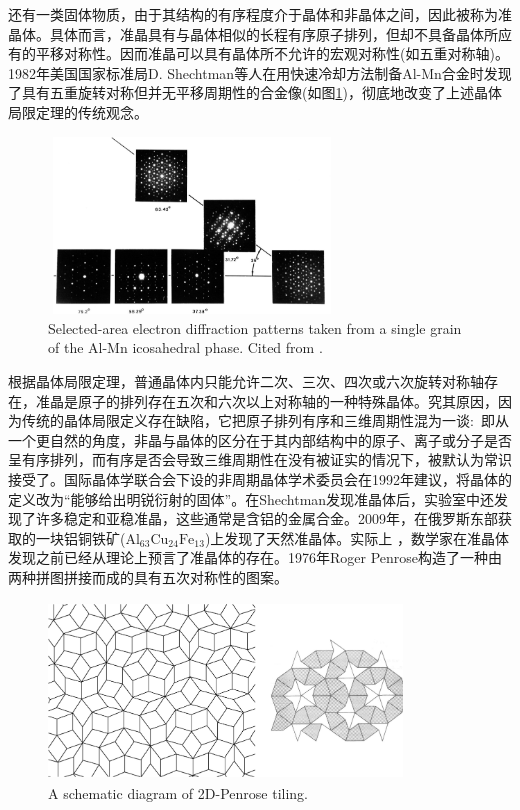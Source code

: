 还有一类固体物质，由于其结构的有序程度介于晶体和非晶体之间，因此被称为准晶体。具体而言，准晶具有与晶体相似的长程有序原子排列，但却不具备晶体所应有的平移对称性。因而准晶可以具有晶体所不允许的宏观对称性(如五重对称轴)。%
1982年美国国家标准局D. Shechtman等人在用快速冷却方法制备Al-Mn合金时发现了具有五重旋转对称但并无平移周期性的合金像(如图\ref{Fig:SSI-03})，彻底地改变了上述晶体局限定理的传统观念。
\begin{figure}[h!]
\centering
\vspace*{-0.1in}
\includegraphics[height=1.85in,width=3.0in,viewport=0 0 791 504,clip]{Figures/quasicrystal.png}
\caption{\small \textrm{Selected-area electron diffraction patterns taken from a single grain of the Al-Mn icosahedral phase. Cited from . }}%
\label{Fig:SSI-03}
\end{figure}
根据晶体局限定理，普通晶体内只能允许二次、三次、四次或六次旋转对称轴存在，准晶是原子的排列存在五次和六次以上对称轴的一种特殊晶体。究其原因，因为传统的晶体局限定义存在缺陷，它把原子排列有序和三维周期性混为一谈:~即从一个更自然的角度，非晶与晶体的区分在于其内部结构中的原子、离子或分子是否呈有序排列，而有序是否会导致三维周期性在没有被证实的情况下，被默认为常识接受了。国际晶体学联合会下设的非周期晶体学术委员会在1992年建议，将晶体的定义改为``能够给出明锐衍射的固体''。在Shechtman发现准晶体后，实验室中还发现了许多稳定和亚稳准晶，这些通常是含铝的金属合金。2009年，在俄罗斯东部获取的一块铝铜铁矿($\mathrm{Al}_{63}\mathrm{Cu}_{24}\mathrm{Fe}_{13}$)上发现了天然准晶体。实际上 ，数学家在准晶体发现之前已经从理论上预言了准晶体的存在。1976年Roger Penrose构造了一种由两种拼图拼接而成的具有五次对称性的图案。
\begin{figure}[h!]
\centering
\vspace*{-0.1in}
\includegraphics[height=1.85in,width=3.7in,viewport=0 0 1931 939,clip]{Figures/Penrose-puzzle.png}
\caption{\small \textrm{A schematic diagram of 2D-Penrose tiling.}}%
\label{Fig:Penrose-puzzle}
\end{figure}
